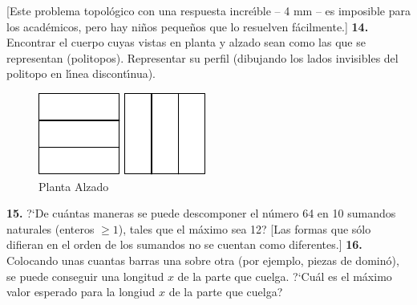 \documentclass[12pt]{article}  %
\begin{document}
[Este problema topol\'ogico con una respuesta incre\'{\i}ble -- 4 mm -- es imposible para los acad\'emicos,
 pero hay ni\~nos peque\~nos que lo resuelven f\'acilmente.]  
\newline\newline\quad
{\bf 14.} Encontrar el cuerpo cuyas vistas en planta y alzado sean como las que se representan (politopos).
Representar su perfil (dibujando los lados invisibles del politopo en l\'{\i}nea discont\'{\i}nua).
\begin{figure}[h]
\centering
\footnotesize
\includegraphics[scale=1]{taskbook-99} \qquad\qquad
\includegraphics[scale=1]{taskbook-98}
\\[2pt]
\hspace{1pt} 
Planta
\hspace{43pt} Alzado
\end{figure}
\newline\quad
{\bf 15.} ?`De cu\'antas maneras se puede descomponer el n\'umero 64 en 10 sumandos naturales (enteros $\ge 1$),
tales que el m\'aximo sea 12?
[Las formas que s\'olo difieran en el orden de los sumandos no se cuentan como diferentes.]
\newline\newline\quad
{\bf 16.} Colocando unas cuantas barras una sobre otra (por ejemplo, piezas de domin\'o),
se puede conseguir una longitud $x$ de la parte que cuelga. ?`Cu\'al es el m\'aximo valor esperado para la longiud 
 $x$ de la parte que cuelga?
\end{document}
